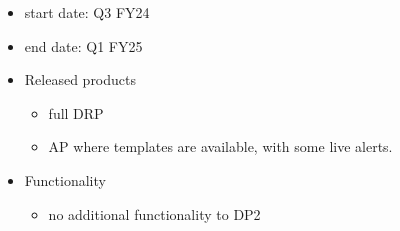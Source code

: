 \begin{itemize}

\item start date: Q3 \gls{FY24}

\item end date: Q1 \gls{FY25}

\item Released products

  \begin{itemize}

  \item full \gls{DRP}

  \item \gls{AP} where templates are available, with some live alerts.

  \end{itemize}

\item Functionality

  \begin{itemize}

  \item no additional functionality to \gls{DP2}

  \end{itemize}

\end{itemize}
